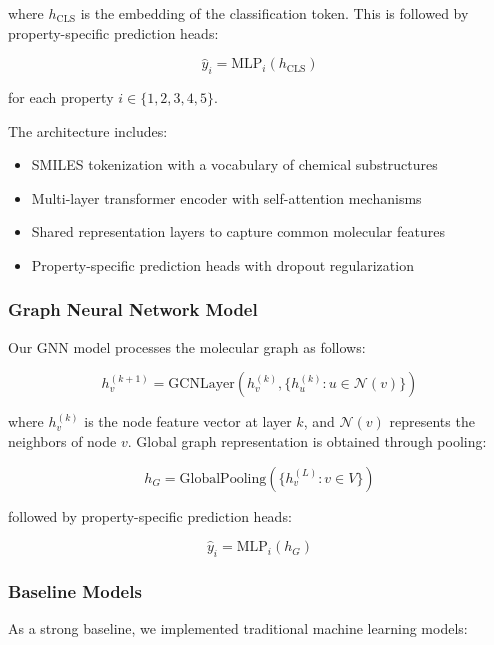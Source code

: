 \documentclass[10pt,twocolumn,letterpaper]{article}
\begin{document}
where $h_{\text{CLS}}$ is the embedding of the classification token. This is followed by property-specific prediction heads:

\begin{equation}
\hat{y}_i = \text{MLP}_i(h_{\text{CLS}})
\end{equation}

for each property $i \in \{1, 2, 3, 4, 5\}$.

The architecture includes:
\begin{itemize}
    \item SMILES tokenization with a vocabulary of chemical substructures
    \item Multi-layer transformer encoder with self-attention mechanisms
    \item Shared representation layers to capture common molecular features
    \item Property-specific prediction heads with dropout regularization
\end{itemize}

\subsubsection{Graph Neural Network Model}

Our GNN model processes the molecular graph as follows:

\begin{equation}
h_v^{(k+1)} = \text{GCNLayer}(h_v^{(k)}, \{h_u^{(k)}: u \in \mathcal{N}(v)\})
\end{equation}

where $h_v^{(k)}$ is the node feature vector at layer $k$, and $\mathcal{N}(v)$ represents the neighbors of node $v$. Global graph representation is obtained through pooling:

\begin{equation}
h_G = \text{GlobalPooling}(\{h_v^{(L)}: v \in V\})
\end{equation}

followed by property-specific prediction heads:

\begin{equation}
\hat{y}_i = \text{MLP}_i(h_G)
\end{equation}

\subsubsection{Baseline Models}

As a strong baseline, we implemented traditional machine learning models:
\end{document}
